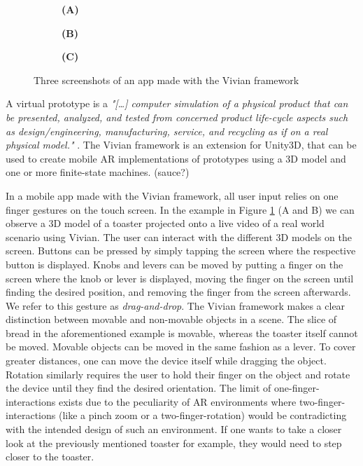 \documentclass[11pt, a4paper]{article}
\begin{document}
\begin{figure}[H]
			\begin{subfigure}[t]{.32\textwidth}\centering
				\textbf{(A)}
			\end{subfigure}
			\begin{subfigure}[t]{.32\textwidth}\centering
				\textbf{(B)}
			\end{subfigure}
			\begin{subfigure}[t]{.32\textwidth}\centering
				\textbf{(C)}
			\end{subfigure}
			\caption{Three screenshots of an app made with the Vivian framework}
			\label{fig:feedbackonphone}
		\end{figure}

		A virtual prototype is a \textit{"\textnormal{[…]} computer simulation of a physical product that can be presented, analyzed, and tested from concerned product life-cycle aspects such as design/engineering, manufacturing, service, and recycling as if on a real physical model."} \cite{Wang2002}. The Vivian framework is an extension for Unity3D, that can be used to create mobile \ac{AR} implementations of prototypes using a 3D model and one or more finite-state machines. (sauce?)

		In a mobile app made with the Vivian framework, all user input relies on one finger gestures on the touch screen. In the example in Figure \ref{fig:feedbackonphone} (A and B) we can observe a 3D model of a toaster projected onto a live video of a real world scenario using Vivian. The user can interact with the different 3D models on the screen. Buttons can be pressed by simply tapping the screen where the respective button is displayed. Knobs and levers can be moved by putting a finger on the screen where the knob or lever is displayed, moving the finger on the screen until finding the desired position, and removing the finger from the screen afterwards. We refer to this gesture as \emph{drag-and-drop}. The Vivian framework makes a clear distinction between movable and non-movable objects in a scene. The slice of bread in the aforementioned example is movable, whereas the toaster itself cannot be moved. Movable objects can be moved in the same fashion as a lever. To cover greater distances, one can move the device itself while dragging the object. Rotation similarly requires the user to hold their finger on the object and rotate the device until they find the desired orientation. The limit of one-finger-interactions exists due to the peculiarity of \ac{AR} environments where two-finger-interactions (like a pinch zoom or a two-finger-rotation) would be contradicting with the intended design of such an environment. If one wants to take a closer look at the previously mentioned toaster for example, they would need to step closer to the toaster.
\end{document}
